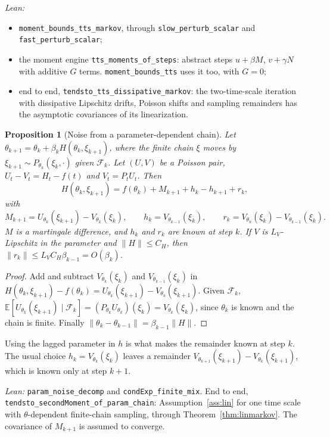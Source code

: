 \documentclass[11pt]{article}
\newtheorem{proposition}[theorem]{Proposition}
\theoremstyle{definition}
\theoremstyle{remark}
\newcommand{\E}{\mathbb{E}}
\begin{document}
\noindent\emph{Lean:}
\begin{itemize}
\item \texttt{moment\_bounds\_tts\_markov}, through \texttt{slow\_perturb\_scalar} and
  \texttt{fast\_perturb\_scalar};
\item the moment engine \texttt{tts\_moments\_of\_steps}: abstract steps $u + \beta M$, $v + \gamma N$ with
  additive $G$ terms. \texttt{moment\_bounds\_tts} uses it too, with $G = 0$;
\item end to end, \texttt{tendsto\_tts\_dissipative\_markov}: the two-time-scale iteration with dissipative
  Lipschitz drifts, Poisson shifts and sampling remainders has the asymptotic covariances of its
  linearization.
\end{itemize}

\begin{proposition}[Noise from a parameter-dependent chain]\label{prop:paramchain}
Let $\theta_{k+1} = \theta_k + \beta_kH(\theta_k, \xi_{k+1})$, where the finite chain $\xi$ moves by
$\xi_{k+1} \sim P_{\theta_k}(\xi_k, \cdot)$ given $\mathcal F_k$. Let $(U, V)$ be a Poisson pair,
$U_t - V_t = H_t - f(t)$ and $V_t = P_tU_t$. Then
\[
  H(\theta_k, \xi_{k+1}) = f(\theta_k) + M_{k+1} + h_k - h_{k+1} + r_k,
\]
with
\[
  M_{k+1} = U_{\theta_k}(\xi_{k+1}) - V_{\theta_k}(\xi_k),\qquad h_k = V_{\theta_{k-1}}(\xi_k),\qquad
  r_k = V_{\theta_k}(\xi_k) - V_{\theta_{k-1}}(\xi_k).
\]
$M$ is a martingale difference, and $h_k$ and $r_k$ are known at step $k$. If $V$ is $L_V$-Lipschitz
in the parameter and $\|H\| \le C_H$, then $\|r_k\| \le L_VC_H\beta_{k-1} = O(\beta_k)$.
\end{proposition}
\begin{proof}
Add and subtract $V_{\theta_k}(\xi_k)$ and $V_{\theta_{k-1}}(\xi_k)$ in
$H(\theta_k, \xi_{k+1}) - f(\theta_k) = U_{\theta_k}(\xi_{k+1}) - V_{\theta_k}(\xi_{k+1})$. Given
$\mathcal F_k$, $\E[U_{\theta_k}(\xi_{k+1})\mid\mathcal F_k] = (P_{\theta_k}U_{\theta_k})(\xi_k) =
V_{\theta_k}(\xi_k)$, since $\theta_k$ is known and the chain is finite. Finally
$\|\theta_k - \theta_{k-1}\| = \beta_{k-1}\|H\|$.
\end{proof}
Using the lagged parameter in $h$ is what makes the remainder known at step $k$. The usual choice
$h_k = V_{\theta_k}(\xi_k)$ leaves a remainder $V_{\theta_{k+1}}(\xi_{k+1}) - V_{\theta_k}(\xi_{k+1})$,
which is known only at step $k + 1$.

\noindent\emph{Lean:} \texttt{param\_noise\_decomp} and \texttt{condExp\_finite\_mix}. End to end,
\texttt{tendsto\_secondMoment\_of\_param\_chain}: Assumption~\ref{ass:lin} for one time scale with
$\theta$-dependent finite-chain sampling, through Theorem~\ref{thm:linmarkov}. The covariance of
$M_{k+1}$ is assumed to converge.
\end{document}
